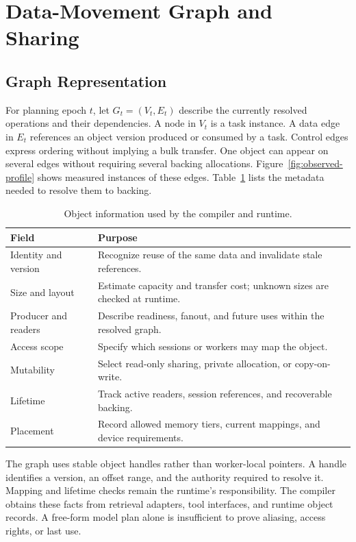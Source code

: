 \documentclass[letterpaper,twocolumn,10pt]{article}
\begin{document}
\section{Data-Movement Graph and Sharing}

\subsection{Graph Representation}

For planning epoch $t$, let $G_t=(V_t,E_t)$ describe the currently resolved
operations and their dependencies. A node in $V_t$ is a task instance. A data
edge in $E_t$ references an object version produced or consumed by a task.
Control edges express ordering without implying a bulk transfer. One object
can appear on several edges without requiring several backing allocations.
Figure~\ref{fig:observed-profile} shows measured instances of these edges.
Table~\ref{tab:objects} lists the metadata needed to resolve them to backing.

\begin{table}[t]
\centering
\caption{Object information used by the compiler and runtime.}
\label{tab:objects}
\begin{tabular}{>{\raggedright\arraybackslash}p{}>{\raggedright\arraybackslash}p{}}
\toprule
Field & Purpose \\
\midrule
Identity and version & Recognize reuse of the same data and invalidate stale references. \\
Size and layout & Estimate capacity and transfer cost; unknown sizes are checked at runtime. \\
Producer and readers & Describe readiness, fanout, and future uses within the resolved graph. \\
Access scope & Specify which sessions or workers may map the object. \\
Mutability & Select read-only sharing, private allocation, or copy-on-write. \\
Lifetime & Track active readers, session references, and recoverable backing. \\
Placement & Record allowed memory tiers, current mappings, and device requirements. \\
\bottomrule
\end{tabular}
\end{table}

The graph uses stable object handles rather than worker-local pointers.
A handle identifies a version, an offset range, and the authority required to
resolve it. Mapping and lifetime checks remain the runtime's responsibility.
The compiler obtains these facts from retrieval adapters, tool interfaces, and
runtime object records. A free-form model plan alone is insufficient to prove
aliasing, access rights, or last use.
\end{document}
